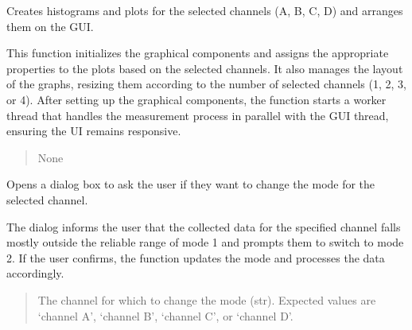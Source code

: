 \documentclass[letterpaper,10pt,english]{sphinxmanual}
\begin{document}
\begin{fulllineitems}
\begin{fulllineitems}
\label{\detokenize{StartStopHist:StartStopHist.StartStopLogic.create_graphs}}
\pysigstartsignatures
{}
\pysigstopsignatures
\sphinxAtStartPar
Creates histograms and plots for the selected channels (A, B, C, D) and arranges them on the GUI.

\sphinxAtStartPar
This function initializes the graphical components and assigns the appropriate properties to the plots based on the selected channels.
It also manages the layout of the graphs, resizing them according to the number of selected channels (1, 2, 3, or 4). 
After setting up the graphical components, the function starts a worker thread that handles the measurement process in parallel with the GUI thread, ensuring the UI remains responsive.
\begin{quote}\begin{description}
\sphinxAtStartPar
None

\end{description}\end{quote}

\end{fulllineitems}


\begin{fulllineitems}
\label{\detokenize{StartStopHist:StartStopHist.StartStopLogic.dialogChangeMode}}
\pysigstartsignatures
{}
\pysigstopsignatures
\sphinxAtStartPar
Opens a dialog box to ask the user if they want to change the mode for the selected channel.

\sphinxAtStartPar
The dialog informs the user that the collected data for the specified channel falls 
mostly outside the reliable range of mode 1 and prompts them to switch to mode 2. 
If the user confirms, the function updates the mode and processes the data accordingly.
\begin{quote}\begin{description}
\sphinxAtStartPar
{} \textendash{} The channel for which to change the mode (str). 
Expected values are ‘channel A’, ‘channel B’, ‘channel C’, or ‘channel D’.


\end{description}
\end{quote}
\end{fulllineitems}
\end{fulllineitems}
\end{document}
